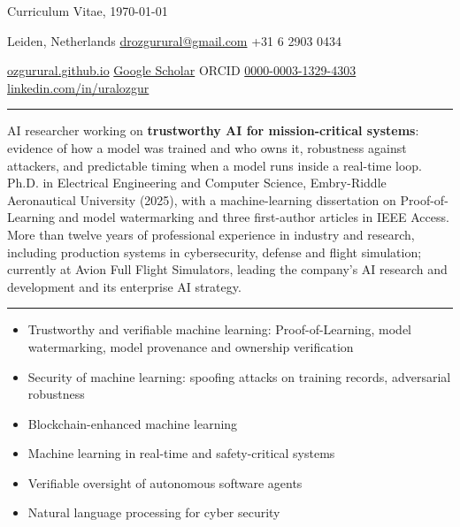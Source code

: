 \documentclass[10pt,a4paper]{article}
\newcommand{\spacedhrule}[2]{\vspace{#1}\hrule\vspace{#2}}
\newcommand{\cvsection}[1]{\par\needspace{4\baselineskip}\vspace{0.5em}{\large\textbf{#1}}\par\vspace{0.1em}\hrule\vspace{0.35em}}
\begin{document}
\sloppy
\renewcommand\labelitemi{\textbullet}

\hfill{\small\color{light}Curriculum Vitae, \today}\par
\vspace{0.3em}
\noindent Leiden, Netherlands \quad\textbullet\quad \href{mailto:drozgurural@gmail.com}{drozgurural@gmail.com} \quad\textbullet\quad +31 6 2903 0434\par
\noindent \href{https://ozgurural.github.io/}{ozgurural.github.io} \quad\textbullet\quad \href{https://scholar.google.com/citations?user=lYx8fqsAAAAJ&hl=en&sortby=pubdate}{Google Scholar} \quad\textbullet\quad ORCID \href{https://orcid.org/0000-0003-1329-4303}{0000-0003-1329-4303} \quad\textbullet\quad \href{https://linkedin.com/in/uralozgur}{linkedin.com/in/uralozgur}\par
{}\par

\spacedhrule{0.4em}{0.4em}

AI researcher working on \textbf{trustworthy AI for mission-critical systems}: evidence of how a model was trained and who owns it, robustness against attackers, and predictable timing when a model runs inside a real-time loop. Ph.D. in Electrical Engineering and Computer Science, Embry-Riddle Aeronautical University (2025), with a machine-learning dissertation on Proof-of-Learning and model watermarking and three first-author articles in IEEE Access. More than twelve years of professional experience in industry and research, including production systems in cybersecurity, defense and flight simulation; currently at Avion Full Flight Simulators, leading the company's AI research and development and its enterprise AI strategy.

\cvsection{RESEARCH INTERESTS}
\begin{itemize}
  \item Trustworthy and verifiable machine learning: Proof-of-Learning, model watermarking, model provenance and ownership verification
  \item Security of machine learning: spoofing attacks on training records, adversarial robustness
  \item Blockchain-enhanced machine learning
  \item Machine learning in real-time and safety-critical systems
  \item Verifiable oversight of autonomous software agents
  \item Natural language processing for cyber security
\end{itemize}
\end{document}

